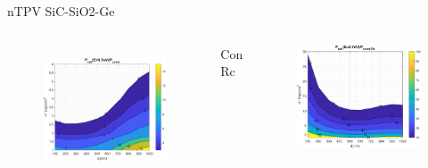 \documentclass[spanish,a4paper]{beamer}%
\begin{document}
\begin{frame}{nTPV SiC-SiO2-Ge}
{\begin{columns}
\begin{figure}[h]
										\includegraphics[width=\columnwidth]{SiC_Ge}
								\label{fig:SiCSiO2Ge_rel}%
						\end{figure}
						\vfill
					\vspace{-12pt}
						\begin{block}{\centering Con Rc}
							\end{block}
					\vspace{10pt}
						\begin{figure}[h]%
								\centering
										\includegraphics[width=\columnwidth]{SiC_Rc}%

\end{figure}
\end{columns}}
\end{frame}
\end{document}
